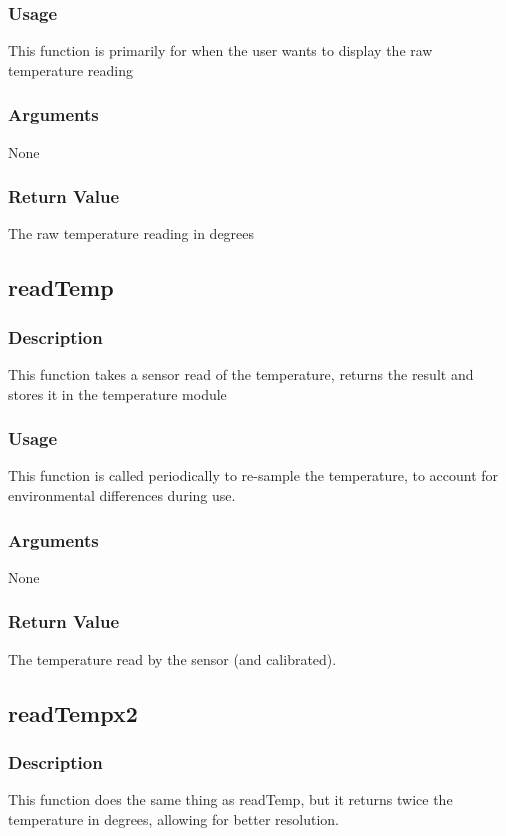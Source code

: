 \documentclass[]{report}
\begin{document}
\subsubsection{Usage}
This function is primarily for when the user wants to display the raw temperature reading

\subsubsection{Arguments}
None

\subsubsection{Return Value}
The raw temperature reading in degrees

\subsection{readTemp}
\subsubsection{Description}
This function takes a sensor read of the temperature, returns the result and stores it in the temperature module

\subsubsection{Usage}
This function is called periodically to re-sample the temperature, to account for environmental differences during use.

\subsubsection{Arguments}
None

\subsubsection{Return Value}
The temperature read by the sensor (and calibrated).

\subsection{readTempx2}
\subsubsection{Description}
This function does the same thing as readTemp, but it returns twice the temperature in degrees, allowing for better resolution.
\end{document}
